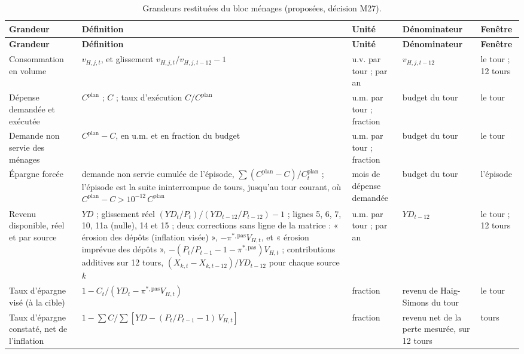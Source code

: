 \documentclass[11pt,a4paper]{article}
\begin{document}
\begin{center}\small
\setlength{\tabcolsep}{4pt}
\begin{longtable}{>{\raggedright\arraybackslash}p{2.4cm}>{\raggedright\arraybackslash}p{5.6cm}>{\raggedright\arraybackslash}p{1.6cm}>{\raggedright\arraybackslash}p{2.6cm}>{\raggedright\arraybackslash}p{2.2cm}}
\caption{Grandeurs restituées du bloc ménages (proposées, décision M27).}\label{tab:menages-restitution}\\
\toprule
\textbf{Grandeur} & \textbf{Définition} & \textbf{Unité} & \textbf{Dénominateur} & \textbf{Fenêtre}\\
\midrule
\endfirsthead
\toprule
\textbf{Grandeur} & \textbf{Définition} & \textbf{Unité} & \textbf{Dénominateur} & \textbf{Fenêtre}\\
\midrule
\endhead
Consommation en volume & $v_{H,j,t}$, et glissement $v_{H,j,t}/v_{H,j,t-12} - 1$ & u.v. par tour ; par an & $v_{H,j,t-12}$ & le tour ; 12 tours\\
Dépense demandée et exécutée & $C^{\mathrm{plan}}$ ; $C$ ; taux d'exécution $C/C^{\mathrm{plan}}$ & u.m. par tour ; fraction & budget du tour & le tour\\
Demande non servie des ménages & $C^{\mathrm{plan}} - C$, en u.m. et en fraction du budget & u.m. par tour ; fraction & budget du tour & le tour\\
Épargne forcée & demande non servie cumulée de l'épisode, $\sum (C^{\mathrm{plan}} - C)/C^{\mathrm{plan}}_t$ ; l'épisode est la suite ininterrompue de tours, jusqu'au tour courant, où $C^{\mathrm{plan}} - C > 10^{-12}\,C^{\mathrm{plan}}$ & mois de dépense demandée & budget du tour & l'épisode\\
Revenu disponible, réel et par source & $\mathit{YD}$ ; glissement réel $(\mathit{YD}_t/P_t)/(\mathit{YD}_{t-12}/P_{t-12}) - 1$ ; lignes 5, 6, 7, 10, 11a (nulle), 14 et 15 ; deux corrections sans ligne de la matrice : « érosion des dépôts (inflation visée) », $-\pi^{\ast,\mathrm{pas}} V_{H,t}$, et « érosion imprévue des dépôts », $-(P_t/P_{t-1} - 1 - \pi^{\ast,\mathrm{pas}}) V_{H,t}$ ; contributions additives sur 12 tours, $(X_{k,t} - X_{k,t-12})/\mathit{YD}_{t-12}$ pour chaque source $k$ & u.m. par tour ; par an & $\mathit{YD}_{t-12}$ & le tour ; 12 tours\\
Taux d'épargne visé (à la cible) & $1 - C_t/(\mathit{YD}_t - \pi^{\ast,\mathrm{pas}} V_{H,t})$ & fraction & revenu de Haig-Simons du tour & le tour\\
Taux d'épargne constaté, net de l'inflation & $1 - \sum C/\sum[\mathit{YD} - (P_t/P_{t-1} - 1)\,V_{H,t}]$ & fraction & revenu net de la perte mesurée, sur 12 tours & 12 tours\\

\end{longtable}
\end{center}
\end{document}
